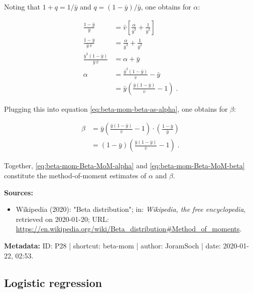 \documentclass[a4paper,12pt,twoside]{book}
\begin{document}
Noting that $1+q = 1/\bar{y}$ and $q = (1-\bar{y})/\bar{y}$, one obtains for $\alpha$:

\begin{equation} \label{eq:beta-mom-Beta-MoM-alpha}
\begin{split}
\frac{1-\bar{y}}{\bar{y}} &= \bar{v} \left[ \frac{\alpha}{\bar{y}^3} + \frac{1}{\bar{y}^2} \right] \\
\frac{1-\bar{y}}{\bar{y} \, \bar{v}} &= \frac{\alpha}{\bar{y}^3} + \frac{1}{\bar{y}^2} \\
\frac{\bar{y}^3(1-\bar{y})}{\bar{y} \, \bar{v}} &= \alpha + \bar{y} \\
\alpha &= \frac{\bar{y}^2(1-\bar{y})}{\bar{v}} - \bar{y} \\
&= \bar{y} \left( \frac{\bar{y} (1-\bar{y})}{\bar{v}} - 1 \right) \; .
\end{split}
\end{equation}

Plugging this into equation \eqref{eq:beta-mom-beta-as-alpha}, one obtains for $\beta$:

\begin{equation} \label{eq:beta-mom-Beta-MoM-beta}
\begin{split}
\beta &= \bar{y} \left( \frac{\bar{y} (1-\bar{y})}{\bar{v}} - 1 \right) \cdot \left( \frac{1-\bar{y}}{\bar{y}} \right) \\
&= (1-\bar{y}) \left( \frac{\bar{y} (1-\bar{y})}{\bar{v}} - 1 \right) \; .
\end{split}
\end{equation}

Together, \eqref{eq:beta-mom-Beta-MoM-alpha} and \eqref{eq:beta-mom-Beta-MoM-beta} constitute the method-of-moment estimates of $\alpha$ and $\beta$.


\vspace{1em}
\textbf{Sources:}
\begin{itemize}
\item Wikipedia (2020): "Beta distribution"; in: \textit{Wikipedia, the free encyclopedia}, retrieved on 2020-01-20; URL: \url{https://en.wikipedia.org/wiki/Beta_distribution#Method_of_moments}.
\end{itemize}


\vspace{1em}
\textbf{Metadata:} ID: P28 | shortcut: beta-mom | author: JoramSoch | date: 2020-01-22, 02:53.
\vspace{1em}



\subsection{Logistic regression}
\end{document}
